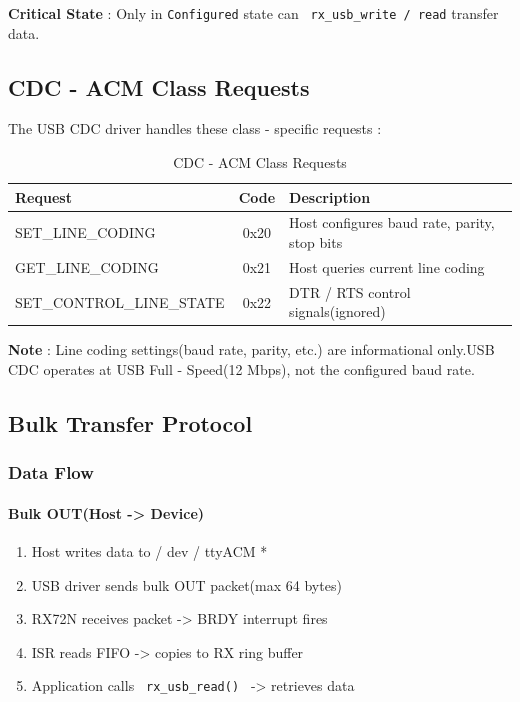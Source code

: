 \textbf{Critical State} : Only in \texttt{Configured} state can \texttt{
                              rx\_usb\_write / read} transfer data.

\subsection{CDC - ACM Class Requests}

                          The USB CDC driver handles these class
    - specific requests :

\begin{table}[h]
\centering
\begin{tabular} {
  | l | c | p{6cm} |
}
\hline
\textbf{Request} & \textbf{Code} & \textbf{Description}
\\
\hline SET\_LINE\_CODING & 0x20 & Host configures baud rate, parity,
    stop bits \\
GET\_LINE\_CODING & 0x21 &
        Host queries current line coding \\
SET\_CONTROL\_LINE\_STATE & 0x22 &
        DTR / RTS control signals(ignored) \\
\hline
\end{tabular}
\caption { CDC - ACM Class Requests}
\label {
tab:
  cdc_requests
}
\end{table}

\textbf{Note} : Line coding settings(baud rate, parity, etc.) are
                informational only.USB CDC operates at USB Full
    - Speed(12 Mbps),
    not the configured baud rate.

\subsection{Bulk Transfer Protocol
}

\subsubsection{Data Flow}

\paragraph { Bulk OUT(Host -> Device)}

\begin{enumerate}
\item Host writes data to / dev / ttyACM *
\item USB driver sends bulk OUT packet(max 64 bytes)
\item RX72N receives packet -> BRDY interrupt fires
\item ISR reads FIFO -> copies to RX ring buffer
\item Application calls \texttt {
  rx\_usb\_read()
}
-> retrieves data
\end{enumerate}

